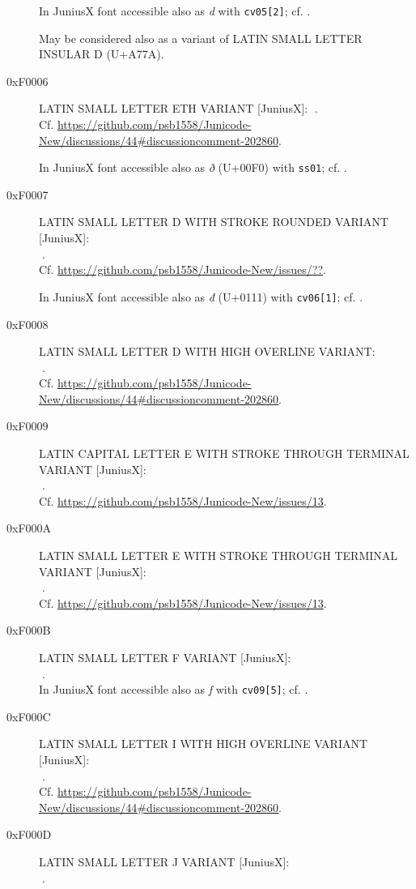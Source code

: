 \documentclass{mwart}
\newcommand{\Jglyph}[1]{{\relsize{2}\J#1}}
\begin{document}
\begin{description}
  In JuniusX font accessible also as \textit{d} with \texttt{cv05[2]};
  cf. \autocite[p. 7]{baker20:_opent_featur_junius_junius}.

  May be considered also as a variant of LATIN SMALL LETTER INSULAR D (U+A77A).


\item [0xF0006] LATIN SMALL LETTER ETH VARIANT [JuniusX]: 
  \Jglyph{󰀆}.\\ Cf. \url{https://github.com/psb1558/Junicode-New/discussions/44#discussioncomment-202860}.

  In JuniusX font accessible also as \textit{ð} (U+00F0) with \texttt{ss01};
  cf. \autocite[p. 11]{baker20:_opent_featur_junius_junius}.

\item [0xF0007] LATIN SMALL LETTER D WITH STROKE ROUNDED VARIANT [JuniusX]:\\
  \Jglyph{󰀇}.\\ Cf. \url{https://github.com/psb1558/Junicode-New/issues/??}.

    In JuniusX font accessible also as \textit{đ}  (U+0111) with \texttt{cv06[1]};
  cf. \autocite[p. 7]{baker20:_opent_featur_junius_junius}.

  
\item [0xF0008] LATIN SMALL LETTER D WITH HIGH OVERLINE VARIANT:\\
  \Jglyph{󰀈}.\\ Cf. \url{https://github.com/psb1558/Junicode-New/discussions/44#discussioncomment-202860}.
\item [0xF0009] LATIN CAPITAL LETTER E WITH STROKE THROUGH TERMINAL VARIANT [JuniusX]:\\
  \Jglyph{󰀉}.\\ Cf. \url{https://github.com/psb1558/Junicode-New/issues/13}.
\item [0xF000A] LATIN SMALL LETTER E WITH STROKE THROUGH TERMINAL VARIANT [JuniusX]:\\
  \Jglyph{󰀊}.\\ Cf. \url{https://github.com/psb1558/Junicode-New/issues/13}.
\item [0xF000B] LATIN SMALL LETTER F VARIANT [JuniusX]:\\
  \Jglyph{󰀋}.\\ %
  In JuniusX font accessible also as \textit{f} with \texttt{cv09[5]};
  cf. \autocite[p. 9]{baker20:_opent_featur_junius_junius}.

\item [0xF000C] LATIN SMALL LETTER I WITH HIGH OVERLINE VARIANT [JuniusX]:\\
  \Jglyph{󰀌}.\\ Cf. \url{https://github.com/psb1558/Junicode-New/discussions/44#discussioncomment-202860}.
\item [0xF000D] LATIN SMALL LETTER J VARIANT [JuniusX]:\\
  \Jglyph{󰀍}.\\ %


\end{description}
\end{document}
